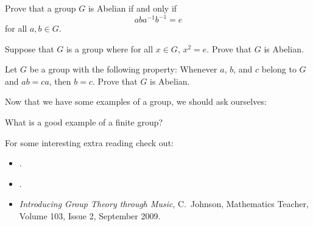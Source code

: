 \documentclass{ximera}
\begin{document}
\begin{exercise}
  Prove that a group $G$ is Abelian if and only if
  \[
  aba^{-1}b^{-1} = e
  \]
  for all $a,b\in G$.
\end{exercise}


\begin{exercise}
  Suppose that $G$ is a group where for all $x\in G$, $x^2 =e$. Prove
  that $G$ is Abelian.
\end{exercise}

\begin{exercise}
  Let $G$ be a group with the following property: Whenever $a$, $b$,
  and $c$ belong to $G$ and $ab = ca$, then $b = c$. Prove that $G$ is
  Abelian.
\end{exercise}


Now that we have some examples of a group, we should ask ourselves:

\begin{question}
  What is a good example of a finite group?
\end{question}









For some interesting extra reading check out:
\begin{itemize}
\item {}.
\item {}.
\item \textit{Introducing Group Theory through Music}, C.\ Johnson, Mathematics Teacher, Volume 103, Issue 2, September 2009.
\end{itemize}
\end{document}
